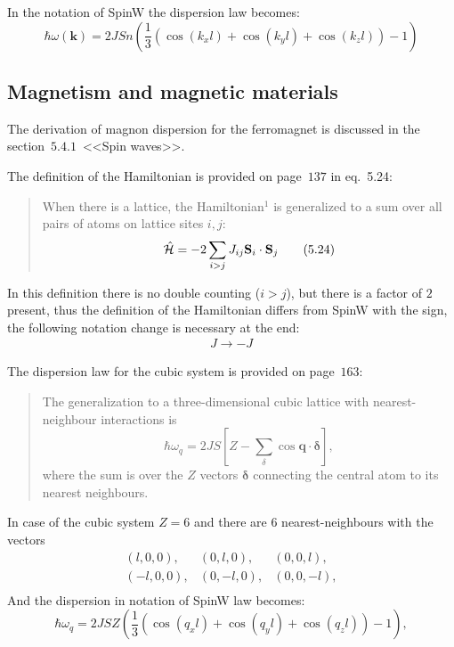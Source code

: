     In the notation of SpinW the dispersion law becomes:
    \begin{equation}
        \hbar\omega(\mathbf{k}) = 2JSn\left(\dfrac{1}{3}\left(\cos(k_xl) + \cos(k_yl) + \cos(k_zl)\right) - 1\right)
    \end{equation}

\subsection{Magnetism and magnetic materials \cite{coey2010magnetism}}
    The derivation of magnon dispersion for the ferromagnet is discussed in the section~$5.4.1$~<<Spin waves>>.

    The definition of the Hamiltonian is provided on page~$137$ in eq.~5.24:

    \begin{quote}
        When there is a lattice, the Hamiltonian$^1$ is generalized to a sum over all pairs of atoms on lattice sites $i, j$:
        \begin{equation}
            \hat{\mathcal{H}} = -2\sum_{i > j} J_{ij} \mathbf{S}_i \cdot \mathbf{S}_j \label{eq:mamm-5.24} \tag{5.24}
        \end{equation}
    \end{quote}

    In this definition there is no double counting ($i > j$), but there is a factor of $2$ present, 
    thus the definition of the Hamiltonian differs from SpinW with the sign, the following notation change is necessary at the end:
    \begin{equation}
        \begin{matrix} 
            J \rightarrow -J
        \end{matrix}
    \end{equation}

    The dispersion law for the cubic system is provided  on page~$163$:
    \begin{quote}
        The generalization to a three-dimensional cubic lattice with nearest-neighbour interactions is
        \begin{equation}
            \hbar \omega_q = 2JS\left[Z - \sum_{\delta}\cos\mathbf{q\cdot\delta}\right],
        \end{equation}
        where the sum is over the $Z$ vectors $\mathbf{\delta}$ connecting the central atom to its nearest neighbours.
    \end{quote}
    In case of the cubic system $Z = 6$ and there are $6$ nearest-neighbours with the vectors
    \begin{equation}
        \begin{matrix}
            (l, 0, 0),& (0, l, 0),& (0, 0, l),\\
            (-l, 0, 0),& (0, -l, 0),& (0, 0, -l),\\
        \end{matrix}
    \end{equation}
    And the dispersion in notation of SpinW law becomes:
    \begin{equation}
        \hbar \omega_q = 2JSZ\left(\dfrac{1}{3}\left(\cos(q_xl) + \cos(q_yl) + \cos(q_zl)\right) - 1\right),
    \end{equation}

